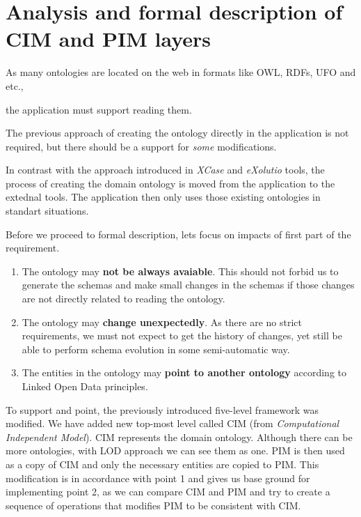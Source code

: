 \chapter{Analysis and formal description of CIM and PIM layers}
\label{chapters:analysis}

\begin{requirement}
    \label{requirement:ontologies-on-the-web}
    As many ontologies are located on the web in formats like OWL, RDFs, UFO and etc.,
    \begin{enumerate*}[label=\textit{(\alph*)}]
        \item the application must support reading them.
        \item The previous approach of creating the ontology directly in the application is not required, but there should be a support for \textit{some} modifications.
      \end{enumerate*}
\end{requirement}

In contrast with the approach introduced in \textit{XCase} and \textit{eXolutio} tools, the process of creating the domain ontology is moved from the application to the extednal tools. The application then only uses those existing ontologies in standart situations.

Before we proceed to formal description, lets focus on impacts of first part of the requirement.

\begin{enumerate}
    \item The ontology may \textbf{not be always avaiable}. This should not forbid us to generate the schemas and make small changes in the schemas if those changes are not directly related to reading the ontology.
    \item The ontology may \textbf{change unexpectedly}. As there are no strict requirements, we must not expect to get the history of changes, yet still be able to perform schema evolution in some semi-automatic way.
    \item The entities in the ontology may \textbf{point to another ontology} according to Linked Open Data principles.
\end{enumerate}

To support  and  point, the previously introduced five-level framework was modified. We have added new top-most level called CIM (from \textit{Computational Independent Model}). CIM represents the domain ontology. Although there can be more ontologies, with LOD approach we can see them as one. PIM is then used as a copy of CIM and only the necessary entities are copied to PIM. This modification is in accordance with point 1 and gives us base ground for implementing point 2, as we can compare CIM and PIM and try to create a sequence of operations that modifies PIM to be consistent with CIM.

